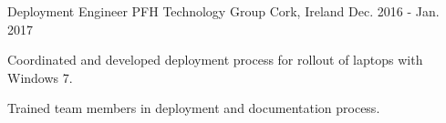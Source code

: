 \begin{cventries}

\cventry
{Deployment Engineer} %
{PFH Technology Group} %
{Cork, Ireland} %
{Dec. 2016 - Jan. 2017} %
{ %
\begin{cvitems}
\item {Coordinated and developed deployment process for rollout of laptops with Windows 7.}
\item {Trained team members in deployment and documentation process.}
\end{cvitems}
}

\end{cventries}
